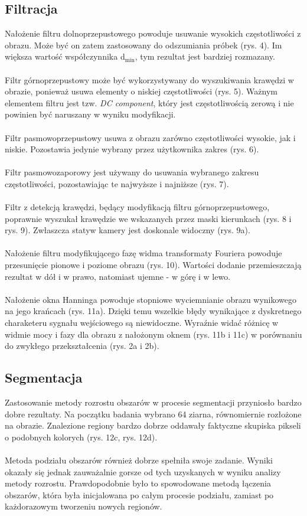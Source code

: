 \documentclass{classrep}
\begin{document}
\subsection{Filtracja}
Nałożenie filtru dolnoprzepustowego powoduje usuwanie wysokich częstotliwości z obrazu. Może być on zatem zastosowany do odszumiania próbek (rys. 4). Im większa wartość współczynnika d$_{\text{min}}$, tym rezultat jest bardziej rozmazany.\\
\\
\indent
Filtr górnoprzepustowy może być wykorzystywany do wyszukiwania krawędzi w obrazie, ponieważ usuwa elementy o niskiej częstotliwości (rys. 5). Ważnym elementem filtru jest tzw. \textit{DC component}, który jest częstotliwością zerową i nie powinien być naruszany w wyniku modyfikacji.\\
\\
\indent
Filtr pasmowoprzepustowy usuwa z obrazu zarówno częstotliwości wysokie, jak i niskie. Pozostawia jedynie wybrany przez użytkownika zakres (rys. 6).\\
\\
\indent
Filtr pasmowozaporowy jest używany do usuwania wybranego zakresu częstotliwości, pozostawiając te najwyższe i najniższe (rys. 7).\\
\\
\indent
Filtr z detekcją krawędzi, będący modyfikacją filtru górnoprzepustowego, poprawnie wyszukał krawędzie we wskazanych przez maski kierunkach (rys. 8 i rys. 9). Zwłaszcza statyw kamery jest doskonale widoczny (rys. 9a).\\
\\
\indent
Nałożenie filtru modyfikującego fazę widma transformaty Fouriera powoduje przesunięcie pionowe i poziome obrazu (rys. 10). Wartości dodanie przemieszczają rezultat w dół i w prawo, natomiast ujemne - w górę i w lewo.\\
\\
\indent
Nałożenie okna Hanninga powoduje stopniowe wyciemnianie obrazu wynikowego na jego krańcach (rys. 11a). Dzięki temu wszelkie błędy wynikające z dyskretnego charaketeru sygnału wejściowego są niewidoczne. Wyraźnie widać różnicę w widmie mocy i fazy dla obrazu z nałożonym oknem (rys. 11b i 11c) w porównaniu do zwykłego przekształcenia (rys. 2a i 2b).

\subsection{Segmentacja}
Zastosowanie metody rozrostu obszarów w procesie segmentacji przyniosło bardzo dobre rezultaty. Na początku badania wybrano 64 ziarna, równomiernie rozłożone na obrazie. Znalezione regiony bardzo dobrze oddawały faktyczne skupiska pikseli o podobnych kolorych (rys. 12c, rys. 12d).\\
\\
\indent
Metoda podziału obszarów również dobrze spełniła swoje zadanie. Wyniki okazały się jednak zauważalnie gorsze od tych uzyskanych w wyniku analizy metody rozrostu. Prawdopodobnie było to spowodowane metodą łączenia obszarów, która była inicjalowana po całym procesie podziału, zamiast po każdorazowym tworzeniu nowych regionów. 
\end{document}

